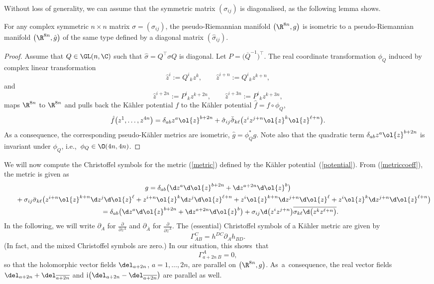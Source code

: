 Without loss of generality, we can assume that the symmetric matrix {$(\sigma_{ij})$} is diagonalised, as the following lemma shows.
\begin{Lemma}\label{diag:lem}
For any complex symmetric $n\times n$ matrix $\sigma=(\sigma_{ij})$, the pseudo-Riemannian manifold $\bigl(\R^{8n},g\bigr)$ is isometric to a pseudo-Riemannian manifold $\bigl(\R^{8n},\hat g\bigr)$ of the same type defined by a diagonal matrix $(\hat\sigma_{ij})$.
\end{Lemma}

\begin{proof}
Assume that $Q\in \GL(n,\C)$ such that $\hat \sigma=Q^\top \sigma Q$ is diagonal. Let $P=\bigl(\overline{Q}^{-1}\bigr)^\top$. The real coordinate transformation $\phi_Q$ induced by complex linear transformation
\[ \hat{z}^{i}:=Q^i{}_k z^{k},\qquad \hat{z}^{i+n}:=Q^i{}_k z^{k+n},\]
and
\[ \hat{z}^{i+2n}:=P^i{}_k z^{k+2n},\qquad {\hat{z}^{i+3n}}:=P^i{}_k z^{k+3n},\]
maps $\R^{8n}$ to $\R^{8n}$ and pulls back the K\"{a}hler potential $f$ to the K\"{a}hler potential $\hat f= f\circ \phi_Q$,
\[
\hat f\bigl({z}^1,\ldots , {z}^{4n}\bigr)
=\delta_{ab} {z}^a\ol{{z}}^{b+2n}+
\hat\sigma_{ij}\bar{\hat\sigma}_{k\ell}
 \bigl(
 {z}^{i}{z}^{j+n}\ol{{z}}^{k} \ol{{z}}^{\ell+n}
 \bigr).
 \]
 As a consequence, the corresponding pseudo-K\"{a}hler metrics are isometric, $\hat g=\phi_Q^*g$. Note also that the quadratic term $\delta_{ab} {z}^a\ol{{z}}^{b+2n}$ is invariant under $\phi_Q$, i.e.,~$\phi_Q\in \O(4n,4n)$.
\end{proof}

We will now compute the Christoffel symbols for the metric (\ref{metric}) defined by the K\"{a}hler potential~(\ref{potential}). From (\ref{metriccoeff}), the metric is given as
\begin{gather}
g =\delta_{ab} \bigl(\d z^a\d \ol{z}^{b+2n} + \d z^{a+2n}\d \ol{z}^{b}\bigr)
\nonumber\\ \hphantom{g=}{}
 +
\sigma_{ij}\bar{\sigma}_{k\ell}
 \bigl(
 z^{i+n}\ol{z}^{k+n}\d z^{j}\d\ol{z}^{\ell}
 +
 z^{i+n}\ol{z}^{k}\d z^{j}\d\ol{z}^{\ell+n}
 +
 z^{i}\ol{z}^{k+n}\d z^{j+n}\d\ol{z}^{\ell}
 +
 z^{i}\ol{z}^{k}\d z^{j+n}\d\ol{z}^{\ell+n}\bigr)
\nonumber\\ \hphantom{g}{}
 =
\delta_{ab} \bigl(\d z^a\d \ol{z}^{b+2n} + \d z^{a+2n}\d \ol{z}^{b}\bigr)
+
 \sigma_{ij} \d\bigl(z^{i} z^{j+n}\bigr)
 \overline{
 \sigma_{k\ell} \d\bigl(z^{k} z^{\ell+n}\bigr)}
.\label{metriclong}
\end{gather}
In the following, we will write $\partial_A$ for $\frac{\partial}{\partial z^A}$ and $\partial_{\overline{A}}$ for $\frac{\partial}{\partial \overline{z}^A}$.
The {(essential)} Christoffel symbols of a K\"{a}hler metric are given by \cite[Section~IX.5]{ko-no2}
\[\Gamma^C_{AB} =h^{DC}\partial_Ah_{BD}.\]
\big(In fact,  and the mixed Christoffel symbols are zero.\big)
In our situation, this shows~that
\[ \Gamma^A_{a+2n\ B}=0,\]
so that the holomorphic vector fields $\del_{a+2n}$, $a=1,\ldots , 2n$, are parallel on $\bigl(\R^{8n}, g\bigr)$. As~a~consequence, the real vector fields
$\del_{a+2n}+\del_{\overline{a+2n}}$ and $\mathrm{i}{\bigl(\del_{a+2n}-\del_{\overline{a+2n}}\bigr)}$ are parallel as well.

